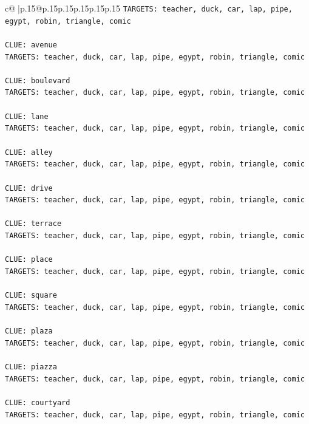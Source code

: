 \documentclass{article}
\begin{document}
{\begin{supertabular}{c@{$\;$}|p{.15\linewidth}@{}p{.15\linewidth}p{.15\linewidth}p{.15\linewidth}p{.15\linewidth}p{.15\linewidth}}
{{{\texttt{TARGETS: teacher, duck, car, lap, pipe, egypt, robin, triangle, comic} \\
\\ 
\texttt{CLUE: avenue} \\
\texttt{TARGETS: teacher, duck, car, lap, pipe, egypt, robin, triangle, comic} \\
\\ 
\texttt{CLUE: boulevard} \\
\texttt{TARGETS: teacher, duck, car, lap, pipe, egypt, robin, triangle, comic} \\
\\ 
\texttt{CLUE: lane} \\
\texttt{TARGETS: teacher, duck, car, lap, pipe, egypt, robin, triangle, comic} \\
\\ 
\texttt{CLUE: alley} \\
\texttt{TARGETS: teacher, duck, car, lap, pipe, egypt, robin, triangle, comic} \\
\\ 
\texttt{CLUE: drive} \\
\texttt{TARGETS: teacher, duck, car, lap, pipe, egypt, robin, triangle, comic} \\
\\ 
\texttt{CLUE: terrace} \\
\texttt{TARGETS: teacher, duck, car, lap, pipe, egypt, robin, triangle, comic} \\
\\ 
\texttt{CLUE: place} \\
\texttt{TARGETS: teacher, duck, car, lap, pipe, egypt, robin, triangle, comic} \\
\\ 
\texttt{CLUE: square} \\
\texttt{TARGETS: teacher, duck, car, lap, pipe, egypt, robin, triangle, comic} \\
\\ 
\texttt{CLUE: plaza} \\
\texttt{TARGETS: teacher, duck, car, lap, pipe, egypt, robin, triangle, comic} \\
\\ 
\texttt{CLUE: piazza} \\
\texttt{TARGETS: teacher, duck, car, lap, pipe, egypt, robin, triangle, comic} \\
\\ 
\texttt{CLUE: courtyard} \\
\texttt{TARGETS: teacher, duck, car, lap, pipe, egypt, robin, triangle, comic} \\
}}}
\end{supertabular}}
\end{document}
